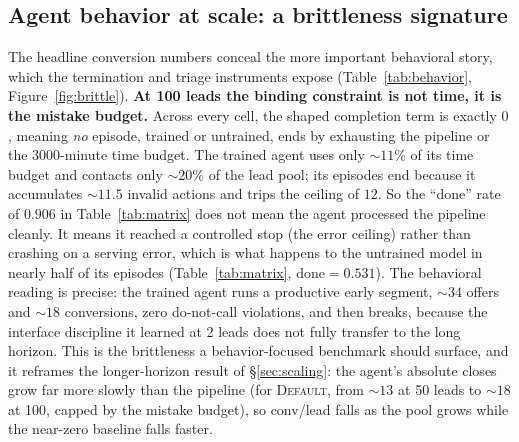 \documentclass{article} %
\begin{document}
\subsection{Agent behavior at scale: a brittleness signature}
\label{sec:behavior}
The headline conversion numbers conceal the more important behavioral story, which the termination and triage
instruments expose (Table~\ref{tab:behavior}, Figure~\ref{fig:brittle}). \textbf{At 100 leads the binding constraint is
not time, it is the mistake budget.} Across every cell, the shaped completion term is exactly $0$, meaning \emph{no} episode, trained
or untrained, ends by exhausting the pipeline or the 3000-minute time budget. The trained agent uses only ${\sim}11\%$
of its time budget and contacts only ${\sim}20\%$ of the lead pool; its episodes end because it accumulates ${\sim}11.5$
invalid actions and trips the ceiling of $12$. So the ``done'' rate of $0.906$ in Table~\ref{tab:matrix} does not mean
the agent processed the pipeline cleanly. It means it reached a controlled stop (the error ceiling) rather than
crashing on a serving error, which is what happens to the untrained model in nearly half of its episodes
(Table~\ref{tab:matrix}, done${=}0.531$). The behavioral reading is precise: the trained agent runs a
productive early segment, ${\sim}34$ offers and ${\sim}18$ conversions, zero do-not-call
violations, and then breaks, because the interface discipline it learned at 2 leads does not fully transfer to the
long horizon. This is the brittleness a behavior-focused benchmark should surface, and it reframes the
longer-horizon result of \S\ref{sec:scaling}: the agent's absolute closes grow far more slowly than the pipeline (for
\textsc{Default}, from ${\sim}13$ at 50 leads to ${\sim}18$ at 100, capped by the mistake budget), so conv/lead falls
as the pool grows while the near-zero baseline falls faster.
\end{document}
